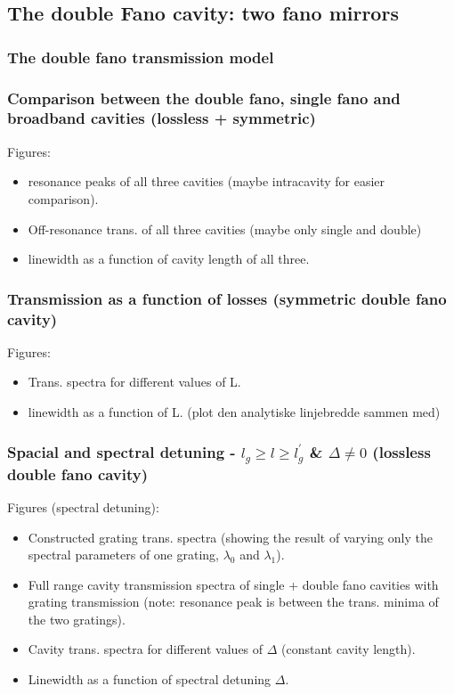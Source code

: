 \subsection{The double Fano cavity: two fano mirrors}

\subsubsection{The double fano transmission model}

\subsubsection{Comparison between the double fano, single fano and broadband cavities (lossless + symmetric)}

Figures:
\begin{itemize}
    \item resonance peaks of all three cavities (maybe intracavity for easier comparison).
    \item Off-resonance trans. of all three cavities (maybe only single and double)
    \item linewidth as a function of cavity length of all three.
\end{itemize}

\subsubsection{Transmission as a function of losses (symmetric double fano cavity)}

Figures:
\begin{itemize}
    \item Trans. spectra for different values of L.
    \item linewidth as a function of L. (plot den analytiske linjebredde sammen med)
\end{itemize}

\subsubsection{Spacial and spectral detuning - $l_{g} \geq l \geq l_{g}^{\prime}$ \& $\Delta \neq 0$ (lossless double fano cavity)}

Figures (spectral detuning): 
\begin{itemize}
    \item Constructed grating trans. spectra (showing the result of varying only the spectral parameters of one grating, $\lambda_0$ and $\lambda_1$).
    \item Full range cavity transmission spectra of single + double fano cavities with grating transmission (note: resonance peak is between the trans. minima of the two gratings).
    \item Cavity trans. spectra for different values of $\Delta$ (constant cavity length).
    \item Linewidth as a function of spectral detuning $\Delta$.
\end{itemize}

